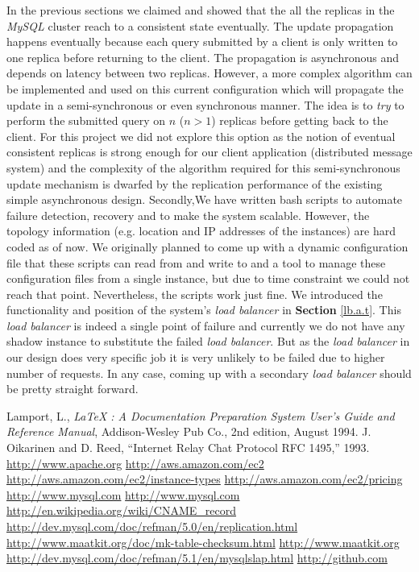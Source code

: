 \documentclass[12pt, twocolumn]{article}
\begin{document}
In the previous sections we claimed and showed that the all the replicas in the \emph{MySQL} cluster reach to a consistent state eventually. The update propagation happens eventually because each query submitted by a client is only written to one replica before returning to the client. The propagation is asynchronous and depends on latency between two replicas. However, a more complex algorithm can be implemented and used on this current configuration which will propagate the update in a semi-synchronous or even synchronous manner. The idea is to \emph{try} to perform the submitted query on $n$ ($n > 1$) replicas before getting back to the client. For this project we did not explore this option as the notion of eventual consistent replicas is strong enough for our client application (distributed message system) and the complexity of the algorithm required for this semi-synchronous update mechanism is dwarfed by the replication performance of the existing simple asynchronous design. Secondly,We have written bash scripts to automate failure detection, recovery and to make the system scalable. However, the topology information (e.g. location and IP addresses of the instances) are hard coded as of now. We originally planned to come up with a dynamic configuration file that these scripts can read from and write to and a tool to manage these configuration files from a single instance, but due to time constraint we could not reach that point. Nevertheless, the scripts work just fine. We introduced the functionality and position of the system\rq{}s \emph{load balancer} in \textbf{Section } \ref{lb.a.t}. This \emph{load balancer} is indeed a single point of failure and currently we do not have any shadow instance to substitute the failed \emph{load balancer}. But as the \emph{load balancer} in our design does very specific job it is very unlikely to be failed due to higher number of requests. In any case, coming up with a secondary \emph{load balancer} should be pretty straight forward. 

\begin{thebibliography}{99}
 Lamport, L., {\it LaTeX : A Documentation
 Preparation System User's Guide and Reference Manual}, Addison-Wesley
 Pub Co., 2nd edition, August 1994.
 J. Oikarinen and D. Reed, “Internet Relay Chat Protocol
RFC 1495,” 1993.
 \url{http://www.apache.org}
  \url{http://aws.amazon.com/ec2}
 \url{http://aws.amazon.com/ec2/instance-types}
\url{http://aws.amazon.com/ec2/pricing}
 \url{http://www.mysql.com}
 \url{http://www.mysql.com}
 \url{http://en.wikipedia.org/wiki/CNAME\_record}
 \url{http://dev.mysql.com/doc/refman/5.0/en/replication.html}
 \url{http://www.maatkit.org/doc/mk-table-checksum.html}
 \url{http://www.maatkit.org}
 \url{http://dev.mysql.com/doc/refman/5.1/en/mysqlslap.html}
 \url{http://github.com}
\end{thebibliography}
\end{document}
